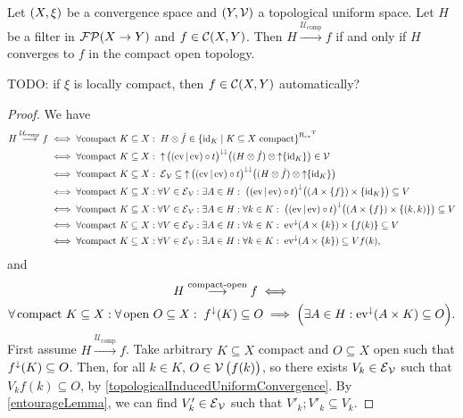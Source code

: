 \begin{proposition} \label{uniformConvergenceOnCompactsImpliesCompactOpenConvergence}
Let $\sSet{X, \xi}$ be a convergence space and $\sSet{Y, \mathcal{V}}$ a topological uniform space. Let $H$ be a filter in $\operatorname{\mathcal{FP}}(X\to Y)$ and $f\in \operatorname{\mathcal{C}}(X, Y)$. 
Then $H \overset{\mathcal{U}_\text{comp}}{\longrightarrow} f$ \textup{if and only if} $H$ converges to $f$ in the compact open topology.
\end{proposition}
TODO: if $\xi$ is locally compact, then $f\in \operatorname{\mathcal{C}}(X,Y)$ automatically?
\begin{proof}
We have
\begin{align*}
H \overset{\mathcal{U}_\text{comp}}{\longrightarrow} f &\iff \forall \text{compact $K\subseteq X$}:\; H\otimes \pfilter{f} \in \setbuilder{\id_K}{\text{$K\subseteq X$ compact}}^{\uRelEv^\transp} \\
&\iff \forall \text{compact $K\subseteq X$}:\; \upset\big((\evalMap | \evalMap)\circ t\big)^{\imf\imf}\big((H\otimes\pfilter{f})\otimes \upset\{\id_K\}\big) \in \mathcal{V} \\
&\iff \forall \text{compact $K\subseteq X$}:\; \entourage_\mathcal{V} \subseteq \upset\big((\evalMap | \evalMap)\circ t\big)^{\imf\imf}\big((H\otimes\pfilter{f})\otimes \upset\{\id_K\}\big) \\
&\iff \forall \text{compact $K\subseteq X$}: \forall V\in \entourage_{\mathcal{V}}: \exists A\in H: \; \big((\evalMap | \evalMap)\circ t\big)^{\imf}\big((A\times\{f\})\times \{\id_K\}\big) \subseteq V \\
&\iff \forall \text{compact $K\subseteq X$}: \forall V\in \entourage_{\mathcal{V}}: \exists A\in H: \forall k\in K: \; \big((\evalMap | \evalMap)\circ t\big)^{\imf}\big((A\times\{f\})\times \{(k,k)\}\big) \subseteq V \\
&\iff \forall \text{compact $K\subseteq X$}: \forall V\in \entourage_{\mathcal{V}}: \exists A\in H: \forall k\in K: \; \evalMap^\imf(A\times \{k\})\times \{f(k)\} \subseteq V \\
&\iff \forall \text{compact $K\subseteq X$}: \forall V\in \entourage_{\mathcal{V}}: \exists A\in H: \forall k\in K: \; \evalMap^\imf(A\times \{k\}) \subseteq Vf(k),
\end{align*}
and
\begin{multline*}
H \overset{\text{compact-open}}{\longrightarrow} f \iff \\
\forall \,\text{compact $K\subseteq X$}: \forall \,\text{open $O\subseteq X$}: \; f^\downarrow(K)\subseteq O \implies \Big(\exists A\in H: \operatorname{ev}^\downarrow(A\times K)\subseteq O\Big).
\end{multline*}
First assume $H \overset{\mathcal{U}_\text{comp}}{\longrightarrow} f$. Take arbitrary $K\subseteq X$ compact and $O\subseteq X$ open such that $f^\downarrow(K)\subseteq O$. Then, for all $k\in K$, $O\in \operatorname{\mathcal{V}}\big(f(k)\big)$, so there exists $V_k\in\operatorname{\mathcal{E}}_{\mathcal{V}}$ such that $V_kf(k)\subseteq O$, by \ref{topologicalInducedUniformConvergence}. By \ref{entourageLemma}, we can find $V'_k\in\operatorname{\mathcal{E}}_\mathcal{V}$ such that $V'_k;V'_k \subseteq V_k$.


\end{proof}

